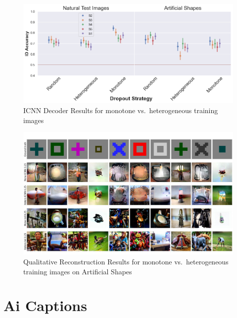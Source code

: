  \begin{figure}[ht]
   \centering
   \includegraphics[width=1\textwidth]{plots/dropout_discussion_translator_id_acc_icnn.png}
   \caption{ICNN Decoder Results for monotone vs.\ heterogeneous training images}\label{fig:dropout_discussion_translator_id_acc_icnn}
 \end{figure}
 
 \begin{figure}[ht]
   \centering
   \includegraphics[width=1\textwidth]{plots/dropout_discussion_art.JPEG}
   \caption{Qualitative Reconstruction Results for monotone vs.\ heterogeneous training images on Artificial Shapes}\label{fig:dropout_discussion_art}
 \end{figure}


\section{Ai Captions}

